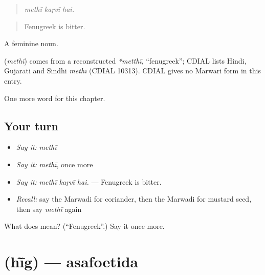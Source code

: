 \begin{quote}
  
\end{quote}

\begin{quote}
\emph{methī kaṛvī hai.}
\end{quote}

\begin{quote}
Fenugreek is bitter.
\end{quote}

A feminine noun.

\begin{cousinweb}
\textbf{} (\emph{methī}) comes from a reconstructed \emph{*metthī}, \textquotedblleft{}fenugreek\textquotedblright{}; CDIAL lists Hindi, Gujarati and Sindhi \emph{methī} (CDIAL 10313). CDIAL gives no Marwari form in this entry.
\end{cousinweb}

\begin{grammarlens}[title={What you've built}]
One more word for this chapter.
\end{grammarlens}

\subsection*{Your turn}
\begin{itemize}
\raggedright
  \item \emph{Say it:} \emph{methī}
  \item \emph{Say it:} \emph{methī}, once more
  \item \emph{Say it:} \emph{methī kaṛvī hai.} — Fenugreek is bitter.
  \item \emph{Recall:} say the Marwadi for coriander, then the Marwadi for mustard seed, then say \emph{methī} again
\end{itemize}

\begin{tcolorbox}[breakable,colback=teal!4,colframe=teal!35!black,title={Before you move on}]
What does  mean? (\textquotedblleft{}Fenugreek\textquotedblright{}.) Say it once more.
\end{tcolorbox}
\section[\texorpdfstring{\mw{हींग} (hī̃g)}{हींग (hī̃g)}]{ (hī̃g) — asafoetida}

\label{lesson:MW-C185-hig}



